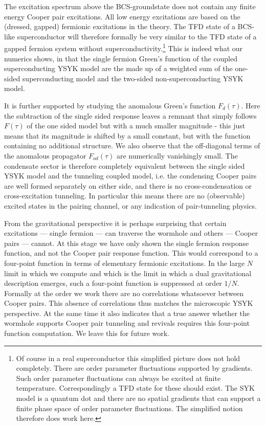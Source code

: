 The excitation spectrum above the BCS-groundstate does not contain any finite energy Cooper pair 
excitations. 
All low energy excitations are based on the (dressed, gapped) fermionic excitations in the theory. The TFD state of a BCS-like superconductor will therefore formally be very similar to the TFD state of a gapped fermion system without superconductivity.\footnote{Of course in a real superconductor this simplified picture does not hold completely. There are order parameter fluctuations supported by gradients. Such order parameter fluctuations can always be excited at finite temperature. Correspondingly a TFD state for these should exist. The SYK model is a quantum dot and there are no spatial gradients that can support a finite phase space of order parameter fluctuations. The simplified notion therefore does work here.} 
This is indeed what our numerics shows, in that the single fermion Green's function of the coupled superconducting YSYK model are the made up of a weighted sum of the one-sided superconducting model and the two-sided non-superconducting YSYK model. 

It is further supported by studying the anomalous Green's function $F_d(\tau)$. Here the subtraction of the single sided response leaves a remnant that simply follows $F(\tau)$ of the one sided model but with a much smaller magnitude - this just means that its magnitude is shifted by a small constant, but with the function containing no additional structure. We also observe that the off-diagonal terms of the anomalous propagator $F_{od}(\tau)$ are numerically vanishingly small. The condensate sector is therefore completely equivalent between the single sided YSYK model and the tunneling coupled model, i.e. the condensing Cooper pairs are well formed separately on either side, and there is no cross-condensation or cross-excitation tunneling. In particular this means there are no (observable) excited states in the pairing channel, or any indication of pair-tunneling physics. 


From the gravitational perspective it is perhaps surprising that certain excitations --- single fermion --- can traverse the wormhole and others --- Cooper pairs --- cannot. At this stage we have only shown the single fermion response function, and not the Cooper pair response function. This would correspond to a four-point function in terms of elementary fermionic excitations. In the large $N$ limit in which we compute and which is the limit in which a dual gravitational description emerges, such a four-point function is suppressed at order $1/N$. Formally at the order we work there are no correlations whatsoever between Cooper pairs. This absence of correlations thus matches the microscopic YSYK perspective. At the same time it also indicates that a true answer whether the wormhole supports Cooper pair tunneling and revivals requires this four-point function computation. We leave this for future work.

